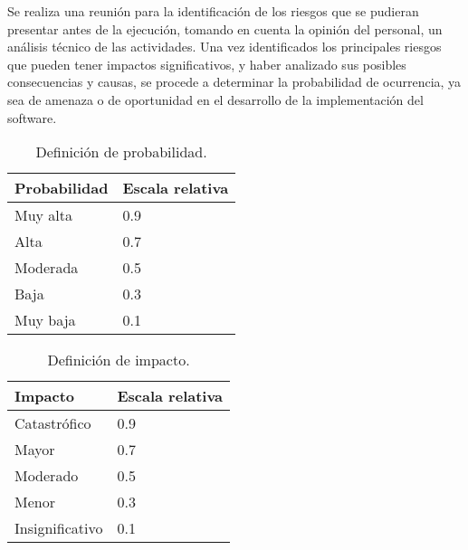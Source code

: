 Se realiza una reunión para la identificación de los riesgos que se pudieran presentar antes de la ejecución, tomando en cuenta la opinión del personal, un análisis técnico de las actividades.
Una vez identificados los principales riesgos que pueden tener impactos significativos, y haber analizado sus posibles consecuencias y causas, se procede a determinar la probabilidad
de ocurrencia, ya sea de amenaza o de oportunidad en el desarrollo de la implementación del software.
\begin{table}[hbtp!]
	\noindent\begin{tabular}{|p{}|p{}|}
		\hline
		{\bf Probabilidad} & {\bf Escala relativa}\\
		\hline
		Muy alta & 0.9 \\
		\hline	 
		Alta & 0.7 \\
		\hline
		Moderada & 0.5 \\
		\hline
		Baja & 0.3 \\
		\hline
		Muy baja & 0.1 \\
		\hline
	\end{tabular}
\begin{flushleft}
		\caption{Definición de probabilidad.}
\end{flushleft}
	\label{tbl:DefinicionProbabilidad}
\end{table}

\begin{table}[hbtp!]
	\noindent\begin{tabular}{|p{}|p{}|}
		\hline
		{\bf Impacto} & {\bf Escala relativa}\\
		\hline
		Catastrófico & 0.9 \\
		\hline	 
		Mayor & 0.7 \\
		\hline
		Moderado & 0.5 \\
		\hline
		Menor & 0.3 \\
		\hline
		Insignificativo & 0.1 \\
		\hline
	\end{tabular}
\begin{flushleft}
		\caption{Definición de impacto.}
\end{flushleft}
	\label{tbl:DefinicionImpacto}
\end{table}

